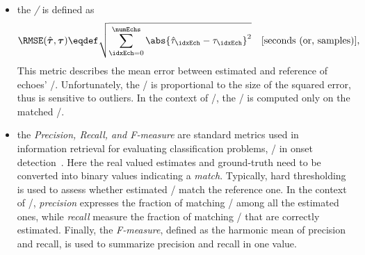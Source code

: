 \begin{itemize}
    \item the \textit{\RMSEtxt/} is defined as
    \begin{equation}
        \RMSE(\hat{\boldsymbol{\tau}}, \boldsymbol{\tau}) \eqdef \sqrt{\sum_{\idxEch=0}^{\numEchs} \abs{\hat{\tau}_\idxEch - \tau_\idxEch}^2} \quad \text{[seconds (or, samples)]}
        ,
    \end{equation}
    This metric describes the mean error between estimated and reference of echoes' \TOAs/.
    Unfortunately, the \RMSEtxt/ is proportional to the size of the squared error, thus is sensitive to outliers.
    In the context of \AER/, the \RMSEtxt/ is computed only on the matched \TOAs/.

    \item the \textit{Precision, Recall, and F-measure} are standard metrics used in information retrieval for evaluating classification problems, \eg/ in onset detection~.
    Here the real valued estimates and ground-truth need to be converted into binary values indicating a \textit{match}.
    Typically, hard thresholding is used to assess whether estimated \TOAs/ match the reference one.
    In the context of \AER/, \textit{precision} expresses the fraction of matching \TOAs/ among all the estimated ones, while \textit{recall} measure the fraction of matching \TOAs/ that are correctly estimated.
    Finally, the \textit{F-measure}, defined as the harmonic mean of precision and recall, is used to summarize precision and recall in one value.

\end{itemize}
